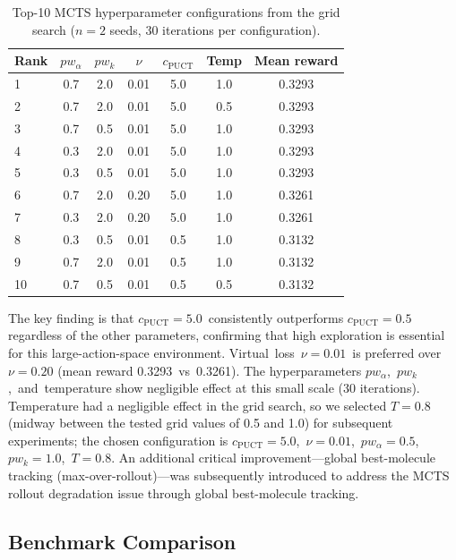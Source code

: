 \documentclass[jcim,article,layout=manuscript]{achemso}
\begin{document}
\begin{table}[htbp]
  \centering
  \caption{Top-10 MCTS hyperparameter configurations from the grid search
    ($n=2$ seeds, 30 iterations per configuration).}
  \label{tab:hparam_search}
  \begin{tabular}{lcccccc}
    \toprule
    Rank & $pw_\alpha$ & $pw_k$ & $\nu$ & $c_{\text{PUCT}}$ & Temp & Mean reward \\
    \midrule
    1 & 0.7 & 2.0 & 0.01 & 5.0 & 1.0 & 0.3293 \\
    2 & 0.7 & 2.0 & 0.01 & 5.0 & 0.5 & 0.3293 \\
    3 & 0.7 & 0.5 & 0.01 & 5.0 & 1.0 & 0.3293 \\
    4 & 0.3 & 2.0 & 0.01 & 5.0 & 1.0 & 0.3293 \\
    5 & 0.3 & 0.5 & 0.01 & 5.0 & 1.0 & 0.3293 \\
    6 & 0.7 & 2.0 & 0.20 & 5.0 & 1.0 & 0.3261 \\
    7 & 0.3 & 2.0 & 0.20 & 5.0 & 1.0 & 0.3261 \\
    8 & 0.3 & 0.5 & 0.01 & 0.5 & 1.0 & 0.3132 \\
    9 & 0.7 & 2.0 & 0.01 & 0.5 & 1.0 & 0.3132 \\
    10 & 0.7 & 0.5 & 0.01 & 0.5 & 0.5 & 0.3132 \\
    \bottomrule
  \end{tabular}
\end{table}

The key finding is that $c_{\text{PUCT}}=5.0$~consistently outperforms
$c_{\text{PUCT}}=0.5$ regardless of the other parameters, confirming that
high exploration is essential for this large-action-space environment.
Virtual~loss~$\nu=0.01$~is preferred over $\nu=0.20$ (mean reward
0.3293~vs~0.3261). The hyperparameters $pw_\alpha$,~$pw_k$,~and~temperature
show negligible effect at this small scale (30 iterations). Temperature had a negligible effect in the grid search, so we selected
$T=0.8$ (midway between the tested grid values of 0.5 and 1.0) for
subsequent experiments; the chosen configuration is
$c_{\text{PUCT}}=5.0$,~$\nu=0.01$,~$pw_\alpha=0.5$,~$pw_k=1.0$,~$T=0.8$.
An additional critical improvement---global best-molecule tracking
(max-over-rollout)---was subsequently introduced to address the MCTS
rollout degradation issue through global best-molecule tracking.

\subsection{Benchmark Comparison}
\end{document}

